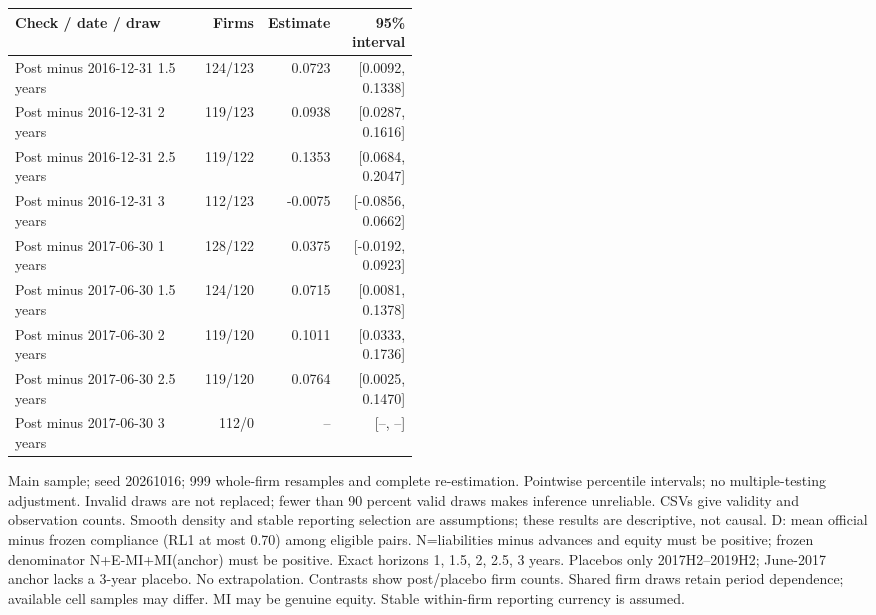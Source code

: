 \par\medskip
\begin{threeparttable}
\begin{tabular}{p{0.47\linewidth}rrr}
\toprule
Check / date / draw & Firms & Estimate & 95\% interval \\
\midrule
Post minus 2016-12-31 1.5 years & 124/123 & 0.0723 & [0.0092, 0.1338] \\
Post minus 2016-12-31 2 years & 119/123 & 0.0938 & [0.0287, 0.1616] \\
Post minus 2016-12-31 2.5 years & 119/122 & 0.1353 & [0.0684, 0.2047] \\
Post minus 2016-12-31 3 years & 112/123 & -0.0075 & [-0.0856, 0.0662] \\
Post minus 2017-06-30 1 years & 128/122 & 0.0375 & [-0.0192, 0.0923] \\
Post minus 2017-06-30 1.5 years & 124/120 & 0.0715 & [0.0081, 0.1378] \\
Post minus 2017-06-30 2 years & 119/120 & 0.1011 & [0.0333, 0.1736] \\
Post minus 2017-06-30 2.5 years & 119/120 & 0.0764 & [0.0025, 0.1470] \\
Post minus 2017-06-30 3 years & 112/0 & -- & [--, --] \\
\bottomrule
\end{tabular}
\begin{tablenotes}[flushleft]\footnotesize
\item[] Main sample; seed 20261016; 999 whole-firm resamples and complete re-estimation. Pointwise percentile intervals; no multiple-testing adjustment. Invalid draws are not replaced; fewer than 90 percent valid draws makes inference unreliable. CSVs give validity and observation counts. Smooth density and stable reporting selection are assumptions; these results are descriptive, not causal. D: mean official minus frozen compliance (RL1 at most 0.70) among eligible pairs. N=liabilities minus advances and equity must be positive; frozen denominator N+E-MI+MI(anchor) must be positive. Exact horizons 1, 1.5, 2, 2.5, 3 years. Placebos only 2017H2--2019H2; June-2017 anchor lacks a 3-year placebo. No extrapolation. Contrasts show post/placebo firm counts. Shared firm draws retain period dependence; available cell samples may differ. MI may be genuine equity. Stable within-firm reporting currency is assumed.
\end{tablenotes}
\end{threeparttable}
\par\medskip
